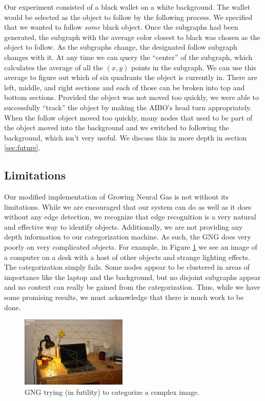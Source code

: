 \documentclass{article}
\renewcommand{\|}{\origbar} %
\begin{document}
Our experiment consisted of a black wallet on a white background. The wallet would be selected as the object to follow by the following process. We specified that we wanted to follow {\em some} black object. Once the subgraphs had been generated, the subgraph with the average color closest to black was chosen as the object to follow. As the subgraphs change, the designated follow subgraph changes with it. At any time we can query the ``center'' of the subgraph, which calculates the average of all the $(x,y)$ points in the subgraph. We can use this average to figure out which of six quadrants the object is currently in. There are left, middle, and right sections and each of those can be broken into top and bottom sections. Provided the object was not moved too quickly, we were able to successfully ``track'' the object by making the AIBO's head turn appropriately. When the follow object moved too quickly, many nodes that used to be part of the object moved into the background and we switched to following the background, which isn't very useful. We discuss this in more depth in section \ref{sec:future}.

\subsection{Limitations}

Our modified implementation of Growing Neural Gas is not without its limitations. While we are encouraged that our system can do as well as it does without any edge detection, we recognize that edge recognition is a very natural and effective way to identify objects. Additionally, we are not providing any depth information to our categorization machine. As such, the GNG does very poorly on very complicated objects. For example, in Figure \ref{fig:badCategorization} we see an image of a computer on a desk with a host of other objects and strange lighting effects. The categorization simply fails. Some nodes appear to be clustered in areas of importance like the laptop and the background, but no disjoint subgraphs appear and no context can really be gained from the categorization. Thus, while we have some promising results, we must acknowledge that there is much work to be done.

\begin{figure}[h!]
  \centering
  
  \includegraphics[width=0.45\textwidth]{bad_categorization.png}
  
  \caption{GNG trying (in futility) to categorize a complex image.}
  \label{fig:badCategorization}
\end{figure}
\end{document}
